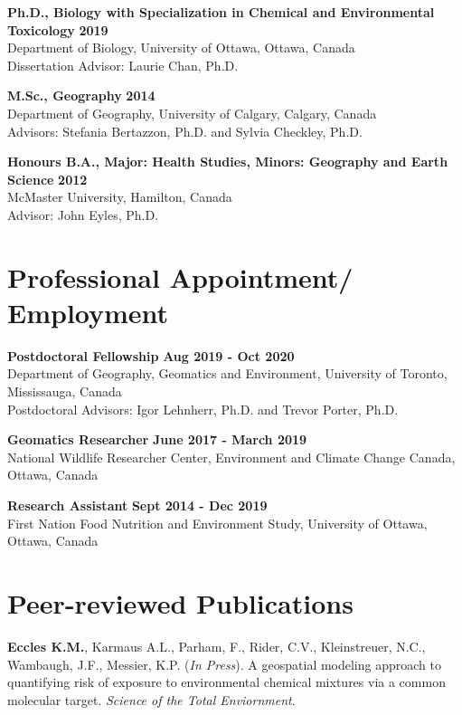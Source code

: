 \documentclass[margin,line]{res}
\begin{document}
\begin{resume}
\textbf{Ph.D., Biology with Specialization in Chemical and Environmental Toxicology} \hfill {\bf 2019}\\
Department of Biology, University of Ottawa, Ottawa, Canada \\
Dissertation Advisor: Laurie Chan, Ph.D.

\textbf{M.Sc., Geography}  \hfill {\bf 2014}\\
Department of Geography, University of Calgary, Calgary, Canada\\
Advisors:  Stefania Bertazzon, Ph.D. and Sylvia Checkley, Ph.D.

\textbf{Honours B.A., Major: Health Studies, Minors: Geography and Earth Science }\hfill {\bf 2012}\\
McMaster University, Hamilton, Canada\\
Advisor: John Eyles, Ph.D.

\vspace*{.1in}
\section{\sc Professional Appointment/ Employment}
{\bf Postdoctoral Fellowship} \hfill {\bf Aug 2019 - Oct 2020}\\
Department of Geography, Geomatics and Environment, University of Toronto, Mississauga, Canada\\
Postdoctoral Advisors: Igor Lehnherr, Ph.D. and Trevor Porter, Ph.D.

{\bf Geomatics Researcher} \hfill {\bf June 2017 - March 2019}\\
National Wildlife Researcher Center, Environment and Climate Change Canada, Ottawa, Canada

{\bf Research Assistant} \hfill {\bf Sept 2014 - Dec 2019}\\
First Nation Food Nutrition and Environment Study, University of Ottawa, Ottawa, Canada

\vspace*{.1in}

\section{\sc Peer-reviewed Publications}

\textbf{Eccles K.M.}, Karmaus A.L., Parham, F., Rider, C.V., Kleinstreuer, N.C., Wambaugh, J.F., Messier, K.P. (\textit{In Press}). A geospatial modeling approach to quantifying risk of exposure to environmental chemical mixtures via a common molecular target. \textit{Science of the Total Enviornment}.


\end{resume}
\end{document}
